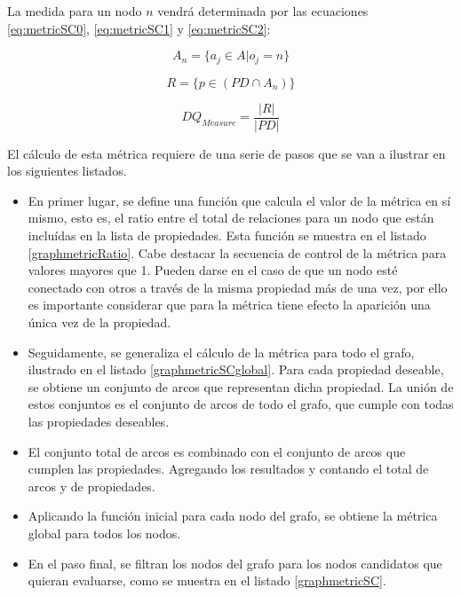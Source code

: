 La medida para un nodo $n$ vendrá determinada por las ecuaciones
\ref{eq:metricSC0}, \ref{eq:metricSC1} y \ref{eq:metricSC2}:

\begin{equation}
A_n = \{ a_j \in A | o_j = n  \}
  \label{eq:metricSC0}
\end{equation}

\begin{equation}
R = \{ p \in (PD \cap A_n) \}
  \label{eq:metricSC1}
\end{equation}

\begin{equation}
  DQ_{Measure} = 
  \frac{|R|}{|PD|}
  \label{eq:metricSC2}
\end{equation}




El cálculo de esta métrica requiere de una serie de pasos que se van a ilustrar
en los siguientes listados. 

\begin{itemize}
\item En primer lugar, se define una función que calcula el valor de la métrica en sí
mismo, esto es, el ratio entre el total de relaciones para un nodo que están
incluídas en la lista de propiedades. Esta función se muestra en el listado
\ref{graphmetricRatio}. Cabe destacar la secuencia de control de la métrica para
valores mayores que 1. Pueden darse en el caso de que un nodo esté conectado con
otros a través de la misma propiedad más de una vez, por ello es importante
considerar que para la métrica tiene efecto la aparición una única vez de la
propiedad. 
\item Seguidamente, se generaliza el cálculo de la métrica para todo el grafo,
ilustrado en el listado \ref{graphmetricSCglobal}. Para
cada propiedad deseable, se obtiene un conjunto de arcos que representan dicha
propiedad. La unión de estos conjuntos es el conjunto de arcos de todo el
grafo, que cumple con todas las propiedades deseables. 
\item El conjunto total de arcos es combinado con el conjunto de arcos que cumplen las
propiedades. Agregando los resultados y contando el total de arcos y de
propiedades. 
\item Aplicando la función inicial para cada nodo del grafo, se obtiene la métrica
global para todos los nodos. 
\item En el paso final, se filtran los nodos del grafo para los nodos candidatos que
quieran evaluarse, como se muestra en el listado \ref{graphmetricSC}.

\end{itemize}

